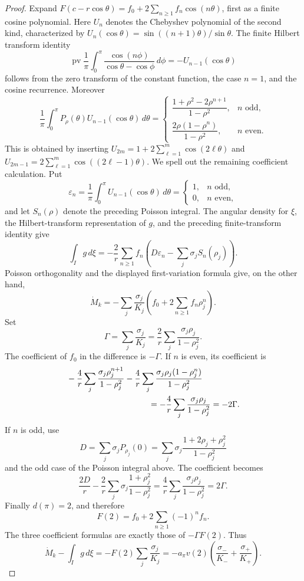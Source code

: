 \documentclass[11pt]{article}
\numberwithin{equation}{section}
\theoremstyle{plain}
\theoremstyle{definition}
\theoremstyle{remark}
\newcommand{\1}{\mathbf 1}
\newcommand{\dd}{\,d}
\newcommand{\pv}{\operatorname {pv}}
\begin{document}
\begin{proof}
Expand $F(c-r\cos\theta)=f_0+2\sum_{n\ge1}f_n\cos(n\theta)$, first as a
finite cosine polynomial.  Here $U_n$ denotes the Chebyshev polynomial of
the second kind, characterized by
$U_n(\cos\theta)=\sin((n+1)\theta)/\sin\theta$.  The finite Hilbert
transform identity
\[
 \pv\frac1\pi\int_0^\pi
 \frac{\cos(n\phi)}{\cos\theta-\cos\phi}\dd\phi
 =-U_{n-1}(\cos\theta)
\]
follows from the zero transform of the constant function, the case $n=1$,
and the cosine recurrence.  Moreover
\[
 \frac1\pi\int_0^\pi P_\rho(\theta)U_{n-1}(\cos\theta)\dd\theta
 =\begin{cases}
 \dfrac{1+\rho^2-2\rho^{n+1}}{1-\rho^2},&n\text{ odd},\\[2mm]
 \dfrac{2\rho(1-\rho^n)}{1-\rho^2},&n\text{ even}.
 \end{cases}
\]
This is obtained by inserting
$U_{2m}=1+2\sum_{\ell=1}^m\cos(2\ell\theta)$ and
$U_{2m-1}=2\sum_{\ell=1}^m\cos((2\ell-1)\theta)$.
We spell out the remaining coefficient calculation.  Put
\[
 \varepsilon_n=\frac1\pi\int_0^\pi
 U_{n-1}(\cos\theta)\dd\theta
 =\begin{cases}1,&n\text{ odd},\\0,&n\text{ even},\end{cases}
\]
and let $S_n(\rho)$ denote the preceding Poisson integral.  The angular
density for $\xi$, the Hilbert-transform representation of $g$, and the
preceding finite-transform identity give
\[
 \int_Ig\dd\xi=-\frac2r\sum_{n\ge1}f_n
 \left(D\varepsilon_n-\sum_j\sigma_jS_n(\rho_j)\right).
\]
Poisson orthogonality and the displayed first-variation formula give, on the other hand,
\[
 \dot M_k=-\sum_j\frac{\sigma_j}{K_j}
 \left(f_0+2\sum_{n\ge1}f_n\rho_j^n\right).
\]
Set
\[
 \Gamma=\sum_j\frac{\sigma_j}{K_j}
 =\frac2r\sum_j\frac{\sigma_j\rho_j}{1-\rho_j^2}.
\]
The coefficient of $f_0$ in the difference is $-\Gamma$.  If $n$ is
even, its coefficient is
\begin{align*}
&-\frac4r\sum_j\frac{\sigma_j\rho_j^{n+1}}{1-\rho_j^2}
 -\frac4r\sum_j\frac{\sigma_j\rho_j(1-\rho_j^n)}{1-\rho_j^2}\\
&\hspace{35mm}=-\frac4r\sum_j
 \frac{\sigma_j\rho_j}{1-\rho_j^2}=-2\Gamma.
\end{align*}
If $n$ is odd, use
\[
 D=\sum_j\sigma_jP_{\rho_j}(0)
 =\sum_j\sigma_j\frac{1+2\rho_j+\rho_j^2}{1-\rho_j^2}
\]
and the odd case of the Poisson integral above.  The coefficient becomes
\[
 \frac{2D}{r}-\frac2r\sum_j\sigma_j
 \frac{1+\rho_j^2}{1-\rho_j^2}
 =\frac4r\sum_j\frac{\sigma_j\rho_j}{1-\rho_j^2}=2\Gamma.
\]
Finally $d(\pi)=2$, and therefore
\[
 F(2)=f_0+2\sum_{n\ge1}(-1)^nf_n.
\]
The three coefficient formulas are exactly those of $-\Gamma F(2)$.
Thus
\begin{equation}
 \boxed{\dot M_k-\int_Ig\dd\xi
 =-F(2)\sum_j\frac{\sigma_j}{K_j}
 =-a_\pi v(2)\left(\frac{\sigma_-}{K_-}
                    +\frac{\sigma_+}{K_+}\right).}
\label{eq:4.23}
\end{equation}


\end{proof}
\end{document}
